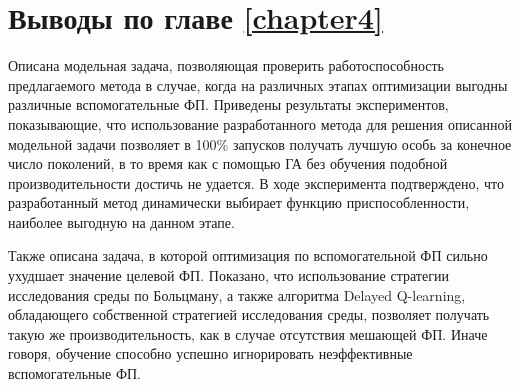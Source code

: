 \section{Выводы по главе \protect\ref{chapter4}}
Описана модельная задача, позволяющая проверить работоспособность предлагаемого метода в случае, когда на различных этапах оптимизации выгодны различные вспомогательные ФП. 
Приведены результаты экспериментов, показывающие, что использование разработанного метода для решения описанной модельной задачи позволяет в 100\% запусков получать лучшую особь 
за конечное число поколений, в то время как с помощью ГА без обучения подобной производительности достичь не удается. В ходе эксперимента подтверждено, что разработанный метод 
динамически выбирает функцию приспособленности, наиболее выгодную на данном этапе.

Также описана задача, в которой оптимизация по вспомогательной ФП сильно ухудшает значение целевой ФП. Показано, что использование стратегии исследования среды по Больцману, а также алгоритма Delayed Q-learning, обладающего собственной стратегией исследования среды, позволяет получать такую же производительность, как в случае отсутствия мешающей ФП. Иначе говоря, обучение способно успешно игнорировать неэффективные вспомогательные ФП.
